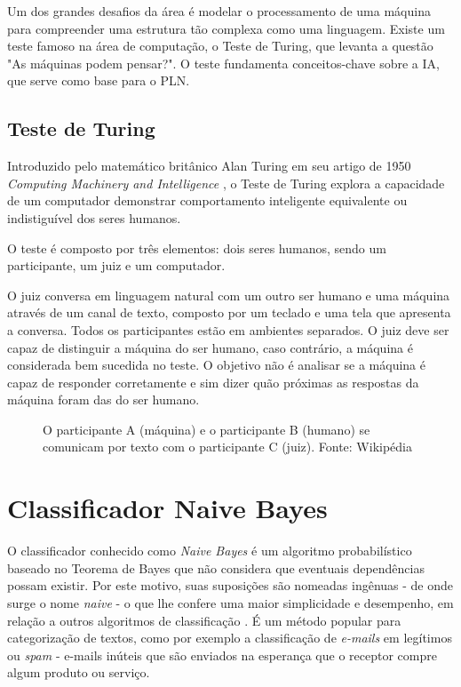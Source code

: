 Um dos grandes desafios da área é modelar o processamento de uma máquina para compreender uma estrutura tão complexa como uma linguagem. Existe um teste famoso na área de computação, o Teste de Turing, que levanta a questão "As máquinas podem pensar?". O teste fundamenta conceitos-chave sobre a \ac{IA}, que serve como base para o PLN.

\subsection{Teste de Turing}

Introduzido pelo matemático britânico Alan Turing em seu artigo de 1950 \textit{Computing Machinery and Intelligence} \cite{turing1950computing}, o Teste de Turing explora a capacidade de um computador demonstrar comportamento inteligente equivalente ou indistiguível dos seres humanos.

O teste é composto por três elementos: dois seres humanos, sendo um participante, um juiz e um computador.

O juiz conversa em linguagem natural com um outro ser humano e uma máquina através de um canal de texto, composto por um teclado e uma tela que apresenta a conversa. Todos os participantes estão em ambientes separados. O juiz deve ser capaz de distinguir a máquina do ser humano, caso contrário, a máquina é considerada bem sucedida no teste. O objetivo não é analisar se a máquina é capaz de responder corretamente e sim dizer quão próximas as respostas da máquina foram das do ser humano.  

\begin{figure}[H]
	\centering{}
	\caption{O participante A (máquina) e o participante B (humano) se comunicam por texto com o participante C (juiz). Fonte: Wikipédia}
	\label{uni}
\end{figure}


\section{Classificador Naive Bayes}\label{sec:naive_bayes}
O classificador conhecido como \textit{Naive Bayes} é um algoritmo probabilístico baseado no Teorema de Bayes que não considera que eventuais dependências possam existir. Por este motivo, suas suposições são nomeadas ingênuas - de onde surge o nome \textit{naive} - o que lhe confere uma maior simplicidade e desempenho, em relação a outros algoritmos de classificação \cite{rennie2003tackling}. É um método popular para categorização de textos, como por exemplo a classificação de \textit{e-mails} em legítimos ou \textit{spam} - e-mails inúteis que são enviados na esperança que o receptor compre algum produto ou serviço. \cite{androutsopoulos2000evaluation}

